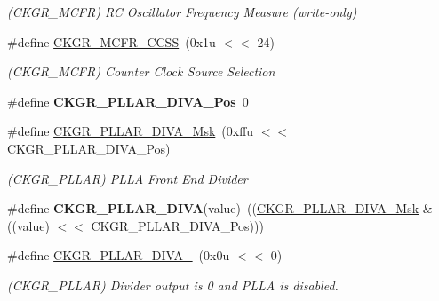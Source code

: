 \begin{DoxyCompactItemize}
\begin{DoxyCompactList}\small\item\em (C\+K\+G\+R\+\_\+\+M\+C\+FR) RC Oscillator Frequency Measure (write-\/only) \end{DoxyCompactList}\item 
\mbox{\label{group__SAMS70__PMC_ga9d97f5615199f9d8c084da0841e5292b}} 
\#define \mbox{\hyperlink{group__SAMS70__PMC_ga9d97f5615199f9d8c084da0841e5292b}{C\+K\+G\+R\+\_\+\+M\+C\+F\+R\+\_\+\+C\+C\+SS}}~(0x1u $<$$<$ 24)
\begin{DoxyCompactList}\small\item\em (C\+K\+G\+R\+\_\+\+M\+C\+FR) Counter Clock Source Selection \end{DoxyCompactList}\item 
\mbox{\label{group__SAMS70__PMC_ga6bea4fc8db6a33b79eddde5a59232816}} 
\#define {\bfseries C\+K\+G\+R\+\_\+\+P\+L\+L\+A\+R\+\_\+\+D\+I\+V\+A\+\_\+\+Pos}~0
\item 
\mbox{\label{group__SAMS70__PMC_gab28dc8be7b52a0a8eb5031a21f1991d0}} 
\#define \mbox{\hyperlink{group__SAMS70__PMC_gab28dc8be7b52a0a8eb5031a21f1991d0}{C\+K\+G\+R\+\_\+\+P\+L\+L\+A\+R\+\_\+\+D\+I\+V\+A\+\_\+\+Msk}}~(0xffu $<$$<$ C\+K\+G\+R\+\_\+\+P\+L\+L\+A\+R\+\_\+\+D\+I\+V\+A\+\_\+\+Pos)
\begin{DoxyCompactList}\small\item\em (C\+K\+G\+R\+\_\+\+P\+L\+L\+AR) P\+L\+LA Front End Divider \end{DoxyCompactList}\item 
\mbox{\label{group__SAMS70__PMC_ga37e2da797562a8a8e9e59e3ec7a04528}} 
\#define {\bfseries C\+K\+G\+R\+\_\+\+P\+L\+L\+A\+R\+\_\+\+D\+I\+VA}(value)~((\mbox{\hyperlink{group__SAMV71__PMC_gab28dc8be7b52a0a8eb5031a21f1991d0}{C\+K\+G\+R\+\_\+\+P\+L\+L\+A\+R\+\_\+\+D\+I\+V\+A\+\_\+\+Msk}} \& ((value) $<$$<$ C\+K\+G\+R\+\_\+\+P\+L\+L\+A\+R\+\_\+\+D\+I\+V\+A\+\_\+\+Pos)))
\item 
\mbox{\label{group__SAMS70__PMC_gad605ace85fa67153f1682aeb90b1b5e5}} 
\#define \mbox{\hyperlink{group__SAMS70__PMC_gad605ace85fa67153f1682aeb90b1b5e5}{C\+K\+G\+R\+\_\+\+P\+L\+L\+A\+R\+\_\+\+D\+I\+V\+A\+\_}}~(0x0u $<$$<$ 0)
\begin{DoxyCompactList}\small\item\em (C\+K\+G\+R\+\_\+\+P\+L\+L\+AR) Divider output is 0 and P\+L\+LA is disabled. \end{DoxyCompactList}\item 

\end{DoxyCompactItemize}
